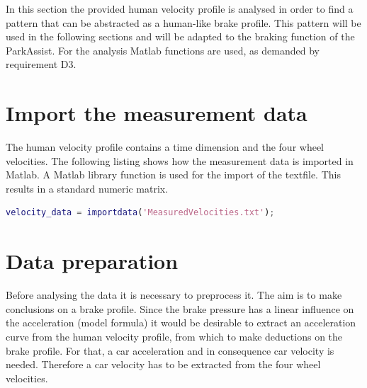 In this section the provided human velocity profile is analysed in order to find a pattern that can be abstracted as a human-like brake profile.
This pattern will be used in the following sections and will be adapted to the braking function of the ParkAssist.
For the analysis Matlab functions are used, as demanded by requirement D3.
\section{Import the measurement data}
The human velocity profile contains a time dimension and the four wheel velocities.
The following listing shows how the measurement data is imported in Matlab.
A Matlab library function is used for the import of the textfile.
This results in a standard numeric matrix.

\begin{lstlisting}[language=Matlab,basicstyle=\scriptsize	,caption= Import measurement data in Matlab,label= lst:D3Import]
%import velocity data
velocity_data = importdata('MeasuredVelocities.txt');
\end{lstlisting}

\section{Data preparation}
Before analysing the data it is necessary to preprocess it. The aim is to make conclusions on a brake profile.
Since the brake pressure has a linear influence on the acceleration (model formula) it would be desirable to extract an acceleration curve from the human velocity profile, from which to make deductions on the brake profile.
For that, a car acceleration and in consequence car velocity is needed.
Therefore a car velocity has to be extracted from the four wheel velocities.\\

